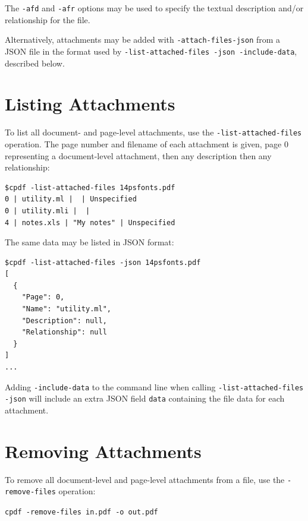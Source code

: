 \documentclass{book}
\begin{document}
The \texttt{-afd} and \texttt{-afr} options may be used to specify the textual description and/or relationship for the file.

Alternatively, attachments may be added with \texttt{-attach-files-json} from a JSON file in the format used by \texttt{-list-attached-files -json -include-data}, described below.

\section{Listing Attachments}
To list all document- and page-level attachments, use the \texttt{-list-attached-files} operation. The page number and filename of each attachment is given, page 0 representing a document-level attachment, then any description then any relationship:

\begin{framed}
{\small\begin{verbatim}
$cpdf -list-attached-files 14psfonts.pdf
0 | utility.ml |  | Unspecified
0 | utility.mli |  |
4 | notes.xls | "My notes" | Unspecified
\end{verbatim}}
\end{framed}

\noindent The same data may be listed in JSON format:

\begin{framed}
{\small\begin{verbatim}
$cpdf -list-attached-files -json 14psfonts.pdf
[
  {
    "Page": 0,
    "Name": "utility.ml",
    "Description": null,
    "Relationship": null
  }
]
...
\end{verbatim}}
\end{framed}

\noindent Adding \texttt{-include-data} to the command line when calling \texttt{-list-attached-files -json} will include an extra JSON field \texttt{data} containing the file data for each attachment. 

  \section{Removing Attachments}
   To remove all document-level and page-level attachments from a file, use the \texttt{-remove-files} operation:

  \begin{framed}
    \noindent\small\verb!cpdf -remove-files in.pdf -o out.pdf!
  \end{framed}
\end{document}

